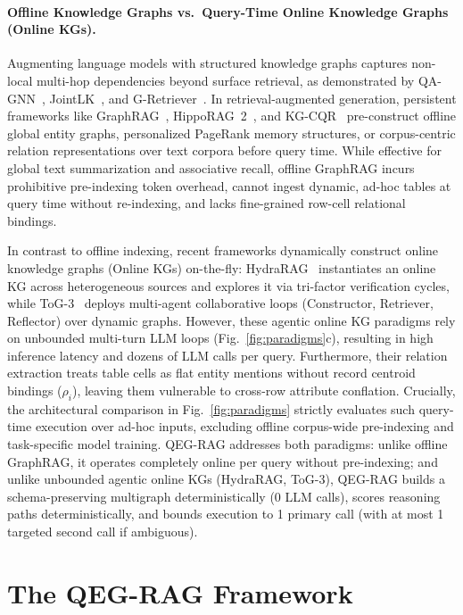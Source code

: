 \documentclass[runningheads]{llncs}
\begin{document}
\paragraph{Offline Knowledge Graphs vs.\ Query-Time Online Knowledge Graphs (Online KGs).}
Augmenting language models with structured knowledge graphs captures non-local multi-hop dependencies beyond surface retrieval, as demonstrated by QA-GNN~\cite{yasunaga2021qagnn}, JointLK~\cite{sun2022jointlk}, and G-Retriever~\cite{he2024gretriever}. In retrieval-augmented generation, persistent frameworks like GraphRAG~\cite{edge2024graphrag}, HippoRAG~2~\cite{gutierrez2025hipporag2}, and KG-CQR~\cite{bui2025kgcqr} pre-construct offline global entity graphs, personalized PageRank memory structures, or corpus-centric relation representations over text corpora before query time. While effective for global text summarization and associative recall, offline GraphRAG incurs prohibitive pre-indexing token overhead, cannot ingest dynamic, ad-hoc tables at query time without re-indexing, and lacks fine-grained row-cell relational bindings.

In contrast to offline indexing, recent frameworks dynamically construct online knowledge graphs (Online KGs) on-the-fly: HydraRAG~\cite{tan2025hydrarag} instantiates an online KG across heterogeneous sources and explores it via tri-factor verification cycles, while ToG-3~\cite{wu2025tog3} deploys multi-agent collaborative loops (Constructor, Retriever, Reflector) over dynamic graphs. However, these agentic online KG paradigms rely on unbounded multi-turn LLM loops (Fig.~\ref{fig:paradigms}c), resulting in high inference latency and dozens of LLM calls per query. Furthermore, their relation extraction treats table cells as flat entity mentions without record centroid bindings ($\rho_i$), leaving them vulnerable to cross-row attribute conflation. Crucially, the architectural comparison in Fig.~\ref{fig:paradigms} strictly evaluates such query-time execution over ad-hoc inputs, excluding offline corpus-wide pre-indexing and task-specific model training. QEG-RAG addresses both paradigms: unlike offline GraphRAG, it operates completely online per query without pre-indexing; and unlike unbounded agentic online KGs (HydraRAG, ToG-3), QEG-RAG builds a schema-preserving multigraph deterministically (0 LLM calls), scores reasoning paths deterministically, and bounds execution to 1 primary call (with at most 1 targeted second call if ambiguous).

\section{The QEG-RAG Framework}
\label{sec:method}
\end{document}
